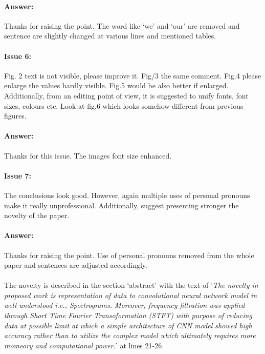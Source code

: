 \documentclass{article}
\begin{document}
\paragraph{Answer:}
Thanks for raising the point. The word like `we' and `our' are removed and sentence are slightly changed at various lines and mentioned tables.

\paragraph{Issue 6:}
\begin{displayquote}
Fig. 2 text is not visible, please improve it.  Fig/3 the same comment. Fig.4 please enlarge the values hardly visible. Fig.5 would be also better if enlarged. Additionally, from an editing point of view, it is suggested to unify fonts, font sizes, colours etc. Look at fig.6 which looks somehow different from previous figures.
\end{displayquote}

\paragraph{Answer:}
Thanks for this issue. The images font size enhanced.

\paragraph{Issue 7:}
\begin{displayquote}
The conclusions look good. However, again multiple uses of personal pronouns make it really unprofessional. Additionally, suggest presenting stronger the novelty of the paper.

\end{displayquote}

\paragraph{Answer:}
Thanks for raising the point. Use of personal pronouns removed from the whole paper and sentences are adjusted accordingly. \\\\

The novelty is described in the section `abstract' with the text of '\textit{The novelty in proposed work is representation of data to convolutional neural network model in well understood i.e., Spectrograms. Moreover, frequency filtration was applied through Short Time Fourier Transoformation (STFT) with purpose of reducing data at possible limit at which a simple architecture of CNN model showed high accuracy rather than to utilize the complex model which ultimately requires more momeory and computational power.}' at lines 21-26
\end{document}
